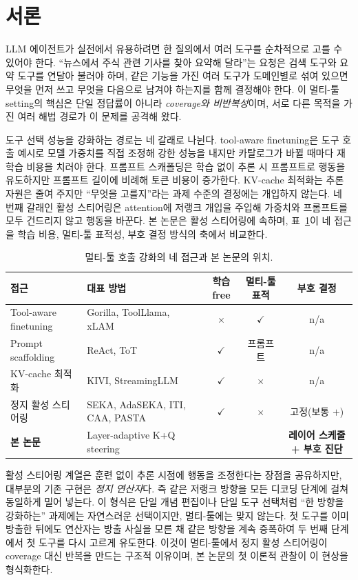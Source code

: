 \section{서론}

LLM 에이전트가 실전에서 유용하려면 한 질의에서 여러 도구를 순차적으로 고를 수 있어야 한다. ``뉴스에서 주식 관련 기사를 찾아 요약해 달라''는 요청은 검색 도구와 요약 도구를 연달아 불러야 하며, 같은 기능을 가진 여러 도구가 도메인별로 섞여 있으면 무엇을 먼저 쓰고 무엇을 다음으로 남겨야 하는지를 함께 결정해야 한다. 이 멀티-툴 setting의 핵심은 단일 정답률이 아니라 \emph{coverage와 비반복성}이며, 서로 다른 목적을 가진 여러 해법 경로가 이 문제를 공격해 왔다.

도구 선택 성능을 강화하는 경로는 네 갈래로 나뉜다. tool-aware finetuning은 도구 호출 예시로 모델 가중치를 직접 조정해 강한 성능을 내지만 카탈로그가 바뀔 때마다 재학습 비용을 치러야 한다. 프롬프트 스캐폴딩은 학습 없이 추론 시 프롬프트로 행동을 유도하지만 프롬프트 길이에 비례해 토큰 비용이 증가한다. KV-cache 최적화는 추론 자원은 줄여 주지만 ``무엇을 고를지''라는 과제 수준의 결정에는 개입하지 않는다. 네 번째 갈래인 활성 스티어링은 attention에 저랭크 개입을 주입해 가중치와 프롬프트를 모두 건드리지 않고 행동을 바꾼다. 본 논문은 활성 스티어링에 속하며, 표~\ref{tab:positioning}이 네 접근을 학습 비용, 멀티-툴 표적성, 부호 결정 방식의 축에서 비교한다.

\begin{table}[t]
\centering
\caption{멀티-툴 호출 강화의 네 접근과 본 논문의 위치.}
\label{tab:positioning}
\small
\begin{tabularx}{\linewidth}{@{}lXccc@{}}
\toprule
접근 & 대표 방법 & 학습 free & 멀티-툴 표적 & 부호 결정 \\
\midrule
Tool-aware finetuning & Gorilla, ToolLlama, xLAM & $\times$ & $\checkmark$ & n/a \\
Prompt scaffolding & ReAct, ToT & $\checkmark$ & 프롬프트 & n/a \\
KV-cache 최적화 & KIVI, StreamingLLM & $\checkmark$ & $\times$ & n/a \\
정지 활성 스티어링 & SEKA, AdaSEKA, ITI, CAA, PASTA & $\checkmark$ & $\times$ & 고정(보통 $+$) \\
\textbf{본 논문} & Layer-adaptive K+Q steering & \boldmath{$\checkmark$} & \boldmath{$\checkmark$} & \textbf{레이어 스케줄 + 부호 진단} \\
\bottomrule
\end{tabularx}
\end{table}

활성 스티어링 계열은 훈련 없이 추론 시점에 행동을 조정한다는 장점을 공유하지만, 대부분의 기존 구현은 \emph{정지 연산자}다. 즉 같은 저랭크 방향을 모든 디코딩 단계에 걸쳐 동일하게 밀어 넣는다. 이 형식은 단일 개념 편집이나 단일 도구 선택처럼 ``한 방향을 강화하는'' 과제에는 자연스러운 선택이지만, 멀티-툴에는 맞지 않는다. 첫 도구를 이미 방출한 뒤에도 연산자는 방출 사실을 모른 채 같은 방향을 계속 증폭하여 두 번째 단계에서 첫 도구를 다시 고르게 유도한다. 이것이 멀티-툴에서 정지 활성 스티어링이 coverage 대신 반복을 만드는 구조적 이유이며, 본 논문의 첫 이론적 관찰이 이 현상을 형식화한다.

